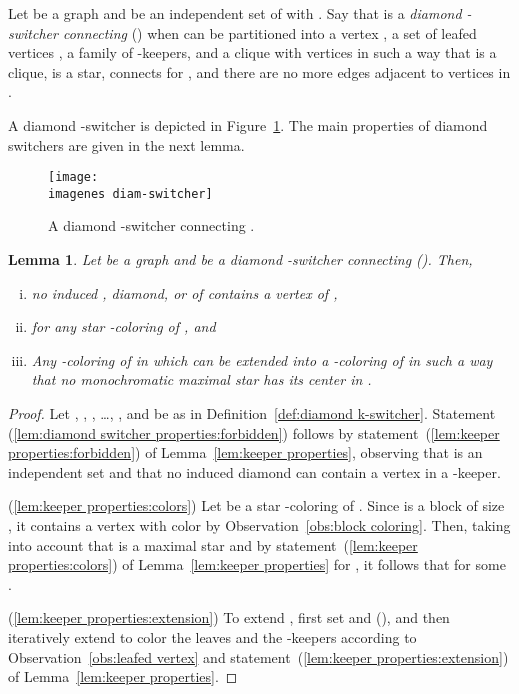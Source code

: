 \documentclass[a4paper, 11pt, oneside]{article}
\newtheorem{lemma}[theorem]{Lemma}
\let\Definition=\emph
\def\imagenes{}
\begin{document}
\begin{defn}\label{def:diamond k-switcher}
  Let  be a graph and  be an independent set of  with .  Say that  is a \Definition{diamond -switcher connecting } () when  can be partitioned into a vertex , a set of leafed vertices , a family  of -keepers, and a clique  with  vertices in such a way that  is a clique,  is a star,  connects  for , and there are no more edges adjacent to vertices in .
\end{defn}

A diamond -switcher is depicted in Figure~\ref{fig:diamond switcher}.  The main properties of diamond switchers are given in the next lemma.

\begin{figure}[htb]
 \centering
 \texttt{[image: \\imagenes diam-switcher]}
 \caption{A diamond -switcher connecting .}\label{fig:diamond switcher}
\end{figure}

\begin{lemma}\label{lem:diamond switcher properties}
 Let  be a graph and  be a diamond -switcher connecting  (). Then,
\begin{enumerate}[(i)]
  \item no induced , diamond, or  of  contains a vertex of ,\label{lem:diamond switcher properties:forbidden}
  \item  for any star -coloring  of , and \label{lem:diamond switcher properties:colors}
  \item Any -coloring  of  in which  can be extended into a -coloring of  in such a way that no monochromatic maximal star has its center in .\label{lem:diamond switcher properties:extension}
\end{enumerate}
\end{lemma}

\begin{proof}
Let , , , \ldots, , and  be as in Definition~\ref{def:diamond k-switcher}.  Statement (\ref{lem:diamond switcher properties:forbidden}) follows by statement~(\ref{lem:keeper properties:forbidden}) of Lemma~\ref{lem:keeper properties}, observing that  is an independent set and that no induced diamond can contain a vertex in a -keeper.  

(\ref{lem:keeper properties:colors}) Let  be a star -coloring of .  Since  is a block of size , it contains a vertex  with color  by Observation~\ref{obs:block coloring}.  Then, taking into account that  is a maximal star and  by statement~(\ref{lem:keeper properties:colors}) of Lemma~\ref{lem:keeper properties} for , it follows that  for some .

(\ref{lem:keeper properties:extension}) To extend , first set  and  (), and then iteratively extend  to color the leaves and the -keepers according to Observation~\ref{obs:leafed vertex} and statement~(\ref{lem:keeper properties:extension}) of Lemma~\ref{lem:keeper properties}.
\end{proof}
\end{document}
